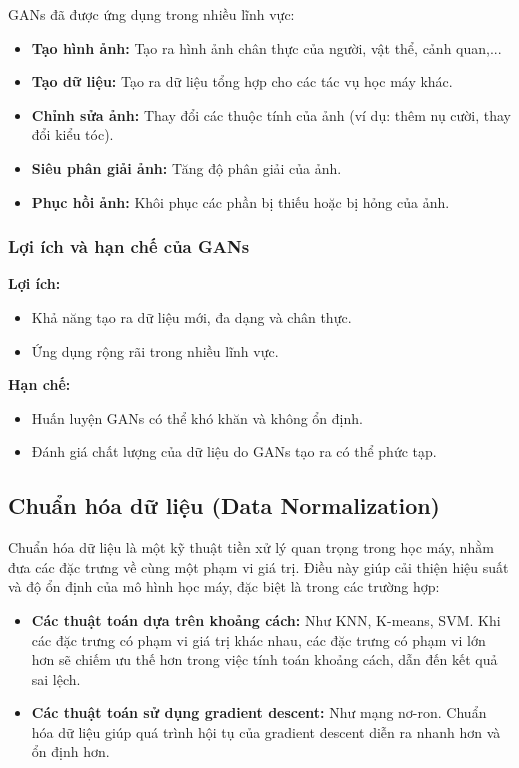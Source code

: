 GANs đã được ứng dụng trong nhiều lĩnh vực:

\begin{itemize}
    \item \textbf{Tạo hình ảnh:} Tạo ra hình ảnh chân thực của người, vật thể, cảnh quan,...
    \item \textbf{Tạo dữ liệu:} Tạo ra dữ liệu tổng hợp cho các tác vụ học máy khác.
    \item \textbf{Chỉnh sửa ảnh:}  Thay đổi các thuộc tính của ảnh (ví dụ: thêm nụ cười, thay đổi kiểu tóc).
    \item \textbf{Siêu phân giải ảnh:} Tăng độ phân giải của ảnh.
    \item \textbf{Phục hồi ảnh:} Khôi phục các phần bị thiếu hoặc bị hỏng của ảnh.
\end{itemize}

\subsubsection{Lợi ích và hạn chế của GANs}

\textbf{Lợi ích:}

\begin{itemize}
    \item Khả năng tạo ra dữ liệu mới, đa dạng và chân thực.
    \item Ứng dụng rộng rãi trong nhiều lĩnh vực.
\end{itemize}

\textbf{Hạn chế:}

\begin{itemize}
    \item Huấn luyện GANs có thể khó khăn và không ổn định.
    \item Đánh giá chất lượng của dữ liệu do GANs tạo ra có thể phức tạp.
\end{itemize}

\subsection{Chuẩn hóa dữ liệu (Data Normalization)}
Chuẩn hóa dữ liệu là một kỹ thuật tiền xử lý quan trọng trong học máy, nhằm đưa các đặc trưng về cùng một phạm vi giá trị. Điều này giúp cải thiện hiệu suất và độ ổn định của mô hình học máy, đặc biệt là trong các trường hợp:

\begin{itemize}
\item \textbf{Các thuật toán dựa trên khoảng cách:} Như KNN, K-means, SVM. Khi các đặc trưng có phạm vi giá trị khác nhau, các đặc trưng có phạm vi lớn hơn sẽ chiếm ưu thế hơn trong việc tính toán khoảng cách, dẫn đến kết quả sai lệch.
\item \textbf{Các thuật toán sử dụng gradient descent:} Như mạng nơ-ron. Chuẩn hóa dữ liệu giúp quá trình hội tụ của gradient descent diễn ra nhanh hơn và ổn định hơn.
\end{itemize}

